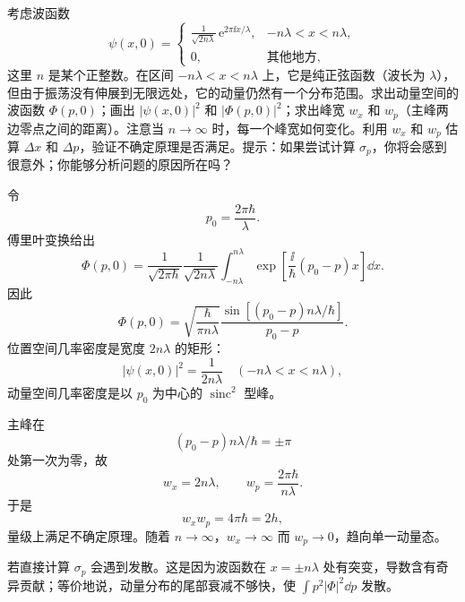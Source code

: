 \begin{question}
考虑波函数
\[
\psi(x,0)=
\begin{cases}
\displaystyle \frac{1}{\sqrt{2n\lambda}}\,\mathrm e^{2\pi \ii x/\lambda},& -n\lambda<x<n\lambda,\\[0.4em]
0,& \text{其他地方},
\end{cases}
\]
这里 $n$ 是某个正整数。在区间 $-n\lambda<x<n\lambda$ 上，它是纯正弦函数（波长为 $\lambda$），但由于振荡没有伸展到无限远处，它的动量仍然有一个分布范围。求出动量空间的波函数 $\Phi(p,0)$；画出 $|\psi(x,0)|^2$ 和 $|\Phi(p,0)|^2$；求出峰宽 $w_x$ 和 $w_p$（主峰两边零点之间的距离）。注意当 $n\to\infty$ 时，每一个峰宽如何变化。利用 $w_x$ 和 $w_p$ 估算 $\Delta x$ 和 $\Delta p$，验证不确定原理是否满足。提示：如果尝试计算 $\sigma_p$，你将会感到很意外；你能够分析问题的原因所在吗？
\end{question}
\begin{solution}
令
\[
p_0=\frac{2\pi\hbar}{\lambda}.
\]
傅里叶变换给出
\[
\Phi(p,0)=\frac1{\sqrt{2\pi\hbar}}\frac1{\sqrt{2n\lambda}}
\int_{-n\lambda}^{n\lambda}
\exp\left[\frac{\ii}{\hbar}(p_0-p)x\right]\dd x.
\]
因此
\[
\boxed{\Phi(p,0)=\sqrt{\frac{\hbar}{\pi n\lambda}}
\frac{\sin[(p_0-p)n\lambda/\hbar]}{p_0-p}.}
\]
位置空间几率密度是宽度 $2n\lambda$ 的矩形：
\[
|\psi(x,0)|^2=\frac1{2n\lambda}
\quad(-n\lambda<x<n\lambda),
\]
动量空间几率密度是以 $p_0$ 为中心的 $\operatorname{sinc}^2$ 型峰。

主峰在
\[
(p_0-p)n\lambda/\hbar=\pm\pi
\]
处第一次为零，故
\[
w_x=2n\lambda,
\qquad
w_p=\frac{2\pi\hbar}{n\lambda}.
\]
于是
\[
w_xw_p=4\pi\hbar=2h,
\]
量级上满足不确定原理。随着 $n\to\infty$，$w_x\to\infty$ 而 $w_p\to0$，趋向单一动量态。

若直接计算 $\sigma_p$ 会遇到发散。这是因为波函数在 $x=\pm n\lambda$ 处有突变，导数含有奇异贡献；等价地说，动量分布的尾部衰减不够快，使 $\int p^2|\Phi|^2\dd p$ 发散。
\end{solution}

